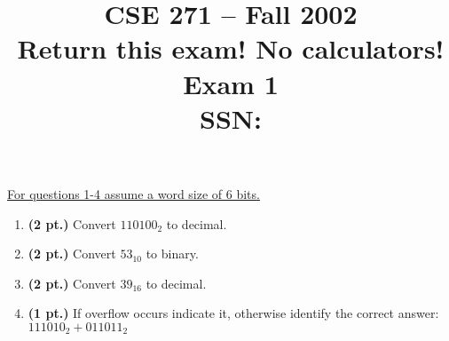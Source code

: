 \documentclass{article}
\begin{document}
\newcommand{\SOPmin}{${\rm SOP}_{\rm min} \ $}
\newcommand{\POSmin}{${\rm POS}_{\rm min} \ $}
\newcommand{\bs}{\backslash}


\title{
\Huge{CSE 271 -- Fall 2002}\\
\normalsize{Return this exam!  No calculators!}\\
\normalsize{Exam 1}\\
SSN:}
\date{}

\maketitle{}

\underline{For questions 1-4 assume a word size of 6 bits.}

\begin{enumerate}
\item {\bf (2 pt.)} Convert $110100_2$ to decimal.

\item {\bf (2 pt.)} Convert $53_{10}$ to binary.

\item {\bf (2 pt.)} Convert $39_{16}$ to decimal.
\pagebreak
\item {\bf (1 pt.)} If overflow occurs indicate it, otherwise identify
the correct answer: $111010_2 + 011011_2$


\end{enumerate}
\end{document}
